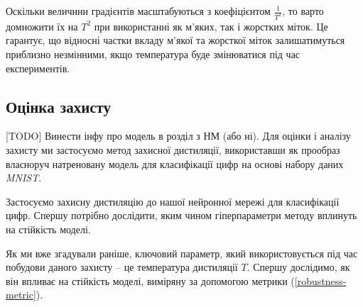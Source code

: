 \documentclass[14pt,a4paper]{extarticle}
\newcounter{e}
\numberwithin{equation}{section}
\numberwithin{figure}{section}
\begin{document}
 Оскільки величини градієнтів масштабуються з коефіцієнтом $\frac{1}{T^2}$, то варто домножити їх на $T^2$ при використанні як м'яких, так і жорстких міток. Це гарантує, що відносні частки вкладу м'якої та жорсткої міток залишатимуться приблизно незмінними, якщо температура буде змінюватися під час експериментів.
 

 
 \subsection{Оцінка захисту}
 
 [TODO] Винести інфу про модель в розділ з НМ (або ні).
 Для оцінки і аналізу захисту ми застосуємо метод захисної дистиляції, використавши як прообраз власноруч натреновану модель для класифікації цифр на основі набору даних \textit{MNIST}.
 
 Застосуємо захисну дистиляцію до нашої нейронної мережі для класифікації цифр. Спершу потрібно дослідити, яким чином гіперпараметри методу вплинуть на стійкість моделі.
 
 Як ми вже згадували раніше, ключовий параметр, який використовується під час побудови даного захисту -- це температура дистиляції $T$. Спершу дослідимо, як він впливає на стійкість моделі, виміряну за допомогою метрики (\ref{robustness-metric}).
 
\end{document}
